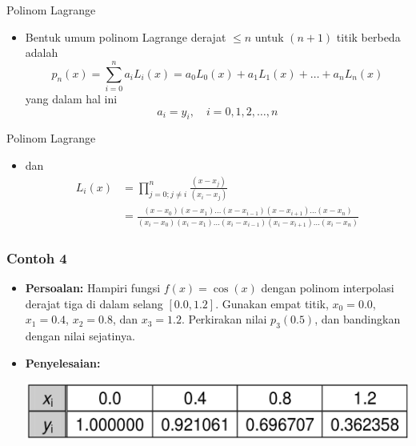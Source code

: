 \documentclass[pdflatex,compress,mathserif]{beamer}
\begin{document}
\begin{frame}{Polinom Lagrange}
	\begin{itemize}
		\item Bentuk umum polinom Lagrange derajat $ \leq  n $ untuk $ (n + 1) $ titik berbeda adalah
		\begin{equation}\label{pol.lagr}
			p_n(x) = \sum_{i=0}^{n} a_i L_i(x) = a_0 L_0(x) + a_1 L_1(x) + \dots + a_n L_n(x)
		\end{equation}
		yang dalam hal ini
		\[ a_i = y_i,\quad i=0,1,2,\dots,n \]
	\end{itemize}
\end{frame}

\begin{frame}{Polinom Lagrange}
	\begin{itemize}
		\item[] dan
		\begin{align*}
		L_i(x) &= \prod_{j=0;j\neq i}^{n} \frac{(x-x_j)}{(x_i-x_j)} \\
		&= \frac{(x-x_0)(x-x_1) \dots (x-x_{i-1})(x-x_{i+1})\dots (x-x_n)}{(x_i -x_0)(x_i-x_1) \dots (x_i-x_{i-1})(x_i-x_{i+1})\dots (x_i-x_n)}
		\end{align*}
	\end{itemize}
\end{frame}

\begin{frame}
	\frametitle{Contoh 4}
	\begin{itemize}
		\item \textbf{Persoalan:} Hampiri fungsi $ f(x) = \cos (x) $ dengan polinom interpolasi derajat tiga di dalam selang $ [0.0, 1.2] $. Gunakan empat titik, $ x_0 = 0.0 $, $ x_1 = 0.4 $, $ x_2 = 0.8 $, dan $ x_3 = 1.2 $. Perkirakan nilai $ p_3(0.5) $, dan bandingkan dengan nilai sejatinya.
		\item \textbf{Penyelesaian:}
		\begin{center}
			\includegraphics[width=0.7\linewidth]{img/img08}
		\end{center}
	\end{itemize}
\end{frame}
\end{document}

